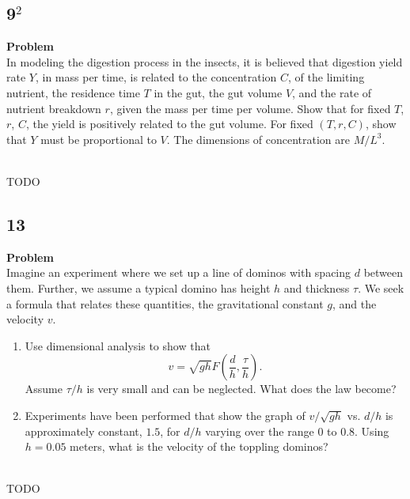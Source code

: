\documentclass[12pt]{article}
\newenvironment{Ex}{\textbf{Problem}\vspace{.75em}\\}{}
\begin{document}
\subsection{9$^2$}
\begin{Ex}
  In modeling the digestion process in the insects, it is believed that
  digestion yield rate $Y$, in mass per time, is related to the concentration
  $C$, of the limiting nutrient, the residence time $T$ in the gut, the gut
  volume $V$, and the rate of nutrient breakdown $r$, given the mass per time
  per volume. Show that for fixed $T$, $r$, $C$, the yield is positively related
  to the gut volume. For fixed $(T,r,C)$, show that $Y$ must be proportional to
  $V$. The dimensions of concentration are $M/L^3$.
  \begin{solution} \hfill \vspace{.75em} \\
    {\huge \color{red}TODO}
  \end{solution}
\end{Ex}

\subsection{13}
\begin{Ex}
  Imagine an experiment where we set up a line of dominos with spacing $d$
  between them. Further, we assume a typical domino has height $h$ and thickness
  $\tau$. We seek a formula that relates these quantities, the gravitational
  constant $g$, and the velocity $v$.

  \begin{enumerate}
  \item Use dimensional analysis to show
    that $$v=\sqrt{gh}F\left(\frac{d}{h},\frac{\tau}{h}\right).$$
    Assume $\tau/h$ is very small and can be neglected. What does the law become?
  \item Experiments have been performed that show the graph of $v/\sqrt{gh}$ vs.
    $d/h$ is approximately constant, $1.5$, for $d/h$ varying over the range $0$
    to $0.8$. Using $h=0.05$ meters, what is the velocity of the toppling dominos?
  \end{enumerate}
  \begin{solution} \hfill \vspace{.75em} \\
    {\huge \color{red}TODO}
  \end{solution}
\end{Ex}
\end{document}
